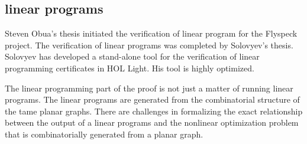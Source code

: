\documentclass{amsart}
\begin{document}
\subsection{linear programs}

Steven Obua's thesis initiated the verification of linear program for
the Flyspeck project. The verification of linear programs was
completed by Solovyev's thesis.  Solovyev has developed a stand-alone
tool for the verification of linear programming certificates in HOL
Light.  His tool is highly optimized.

The linear programming part of the proof is not just a matter of
running linear programs.  The linear programs are generated from the
combinatorial structure of the tame planar graphs.  There are
challenges in formalizing the exact relationship between the output of
a linear programs and the nonlinear optimization problem that is
combinatorially generated from a planar graph.







\newpage


 

\end{document}
